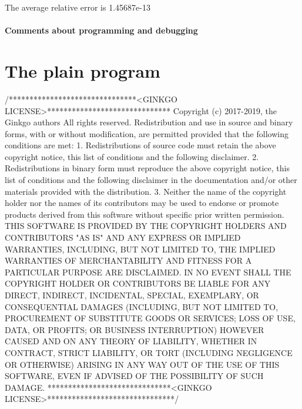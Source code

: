 \begin{DoxyCode}
The average relative error is 1.45687e-13
\end{DoxyCode}


\label{_Commentsaboutprogramminganddebugging}%
\paragraph*{Comments about programming and debugging }

\label{_PlainProg}%
 \section*{The plain program}


\begin{DoxyCodeInclude}
\textcolor{comment}{/*******************************<GINKGO LICENSE>******************************}
\textcolor{comment}{Copyright (c) 2017-2019, the Ginkgo authors}
\textcolor{comment}{All rights reserved.}
\textcolor{comment}{}
\textcolor{comment}{Redistribution and use in source and binary forms, with or without}
\textcolor{comment}{modification, are permitted provided that the following conditions}
\textcolor{comment}{are met:}
\textcolor{comment}{}
\textcolor{comment}{1. Redistributions of source code must retain the above copyright}
\textcolor{comment}{notice, this list of conditions and the following disclaimer.}
\textcolor{comment}{}
\textcolor{comment}{2. Redistributions in binary form must reproduce the above copyright}
\textcolor{comment}{notice, this list of conditions and the following disclaimer in the}
\textcolor{comment}{documentation and/or other materials provided with the distribution.}
\textcolor{comment}{}
\textcolor{comment}{3. Neither the name of the copyright holder nor the names of its}
\textcolor{comment}{contributors may be used to endorse or promote products derived from}
\textcolor{comment}{this software without specific prior written permission.}
\textcolor{comment}{}
\textcolor{comment}{THIS SOFTWARE IS PROVIDED BY THE COPYRIGHT HOLDERS AND CONTRIBUTORS "AS}
\textcolor{comment}{IS" AND ANY EXPRESS OR IMPLIED WARRANTIES, INCLUDING, BUT NOT LIMITED}
\textcolor{comment}{TO, THE IMPLIED WARRANTIES OF MERCHANTABILITY AND FITNESS FOR A}
\textcolor{comment}{PARTICULAR PURPOSE ARE DISCLAIMED. IN NO EVENT SHALL THE COPYRIGHT}
\textcolor{comment}{HOLDER OR CONTRIBUTORS BE LIABLE FOR ANY DIRECT, INDIRECT, INCIDENTAL,}
\textcolor{comment}{SPECIAL, EXEMPLARY, OR CONSEQUENTIAL DAMAGES (INCLUDING, BUT NOT}
\textcolor{comment}{LIMITED TO, PROCUREMENT OF SUBSTITUTE GOODS OR SERVICES; LOSS OF USE,}
\textcolor{comment}{DATA, OR PROFITS; OR BUSINESS INTERRUPTION) HOWEVER CAUSED AND ON ANY}
\textcolor{comment}{THEORY OF LIABILITY, WHETHER IN CONTRACT, STRICT LIABILITY, OR TORT}
\textcolor{comment}{(INCLUDING NEGLIGENCE OR OTHERWISE) ARISING IN ANY WAY OUT OF THE USE}
\textcolor{comment}{OF THIS SOFTWARE, EVEN IF ADVISED OF THE POSSIBILITY OF SUCH DAMAGE.}
\textcolor{comment}{******************************<GINKGO LICENSE>*******************************/}


\end{DoxyCodeInclude}

